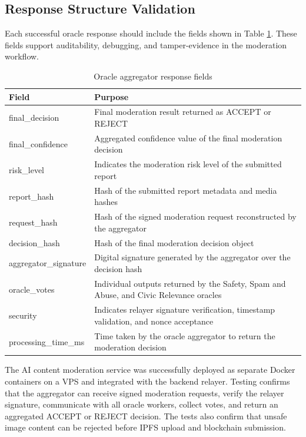 \subsection{Response Structure Validation}
Each successful oracle response should include the fields shown in Table
\ref{tab:oracle-response-fields}. These fields support auditability, debugging, and
tamper-evidence in the moderation workflow.

\begin{table}[h!]
\centering
\caption{Oracle aggregator response fields}
\label{tab:oracle-response-fields}
\begin{tabular}{|p{5cm}|p{9cm}|}
\hline
\textbf{Field} & \textbf{Purpose} \\
\hline
final\_decision & Final moderation result returned as ACCEPT or REJECT \\
\hline
final\_confidence & Aggregated confidence value of the final moderation decision \\
\hline
risk\_level & Indicates the moderation risk level of the submitted report \\
\hline
report\_hash & Hash of the submitted report metadata and media hashes \\
\hline
request\_hash & Hash of the signed moderation request reconstructed by the aggregator \\
\hline
decision\_hash & Hash of the final moderation decision object \\
\hline
aggregator\_signature & Digital signature generated by the aggregator over the decision hash \\
\hline
oracle\_votes & Individual outputs returned by the Safety, Spam and Abuse, and Civic Relevance oracles \\
\hline
security & Indicates relayer signature verification, timestamp validation, and nonce acceptance \\
\hline
processing\_time\_ms & Time taken by the oracle aggregator to return the moderation decision \\
\hline
\end{tabular}
\end{table}

The AI content moderation service was successfully deployed as separate Docker
containers on a VPS and integrated with the backend relayer. Testing confirms
that the aggregator can receive signed moderation requests, verify the relayer
signature, communicate with all oracle workers, collect votes, and return an
aggregated ACCEPT or REJECT decision. The tests also confirm that unsafe image
content can be rejected before IPFS upload and blockchain submission.


